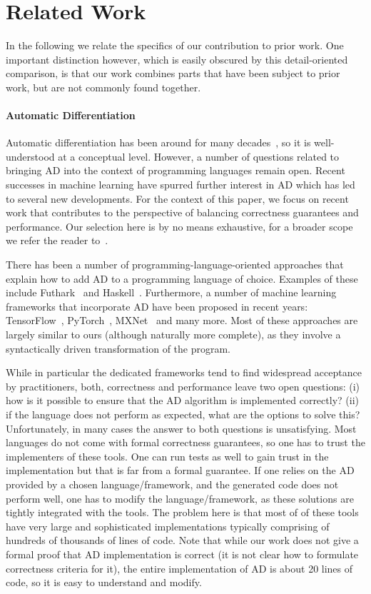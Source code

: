 \section{Related Work\label{sec:relatedwork}}

In the following we relate the specifics of our contribution to prior
work. One important distinction however, which is easily obscured by
this detail-oriented comparison, is that our work combines parts that
have been subject to prior work, but are not commonly found together.

\paragraph{Automatic Differentiation}

Automatic differentiation has been around for many decades~\cite{early-ad1, early-ad2},
so it is well-understood at a conceptual level.  However,
a number of questions related to bringing AD into the context of
programming languages remain open.  Recent successes in machine learning
have spurred further interest in AD which has led to several new developments.
For the context of this paper, we focus on recent work that contributes to 
the perspective of balancing correctness guarantees and performance.
Our selection here is by no means exhaustive, for
a broader scope we refer the reader to~\cite{autodiff-survey}.

There has been a number of programming-language-oriented approaches that explain
how to add AD to a programming language of choice. Examples of these include
Futhark~\cite{futhark/sc22ad} and Haskell~\cite{ad-haskell}.
%
Furthermore, a number of machine learning
frameworks that incorporate AD have been proposed in recent years: TensorFlow~\cite{ad-tf},
PyTorch~\cite{ad-pytorch}, MXNet~\cite{ad-mxnet} and many more.
%
Most of these approaches are largely similar to ours (although naturally more
complete), as they involve a syntactically driven transformation of the program.

While in particular the dedicated frameworks tend to find widespread 
acceptance by practitioners, both, correctness and performance leave
two open questions: (i) how is it possible to
ensure that the AD algorithm is implemented correctly?
(ii) if the
language does not perform as expected, what are the
options to solve this?  Unfortunately, in many cases the answer to
both questions is unsatisfying.  Most languages do not
come with formal correctness guarantees, so one has to trust the
implementers of these tools.  One can run tests as well to gain trust 
in the implementation but that is far from a 
formal guarantee.  If one relies
on the AD provided by a chosen language/framework, and the generated code does not
perform well, one has to modify the language/framework, as these solutions
are tightly integrated with the tools. The problem here is that most of of these tools
have very large and sophisticated implementations typically comprising
of hundreds of thousands of lines of code.  Note that while our work
does not give a formal proof that AD implementation is correct (it is
not clear how to formulate correctness criteria for it), the entire
implementation of AD is about 20 lines of code, so it is easy to
understand and modify.

